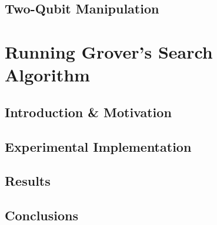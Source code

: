 \subsection{Two-Qubit Manipulation}





\section{Running Grover's Search Algorithm}


\subsection{Introduction \& Motivation}


\subsection{Experimental Implementation}


\subsection{Results}


\subsection{Conclusions}

